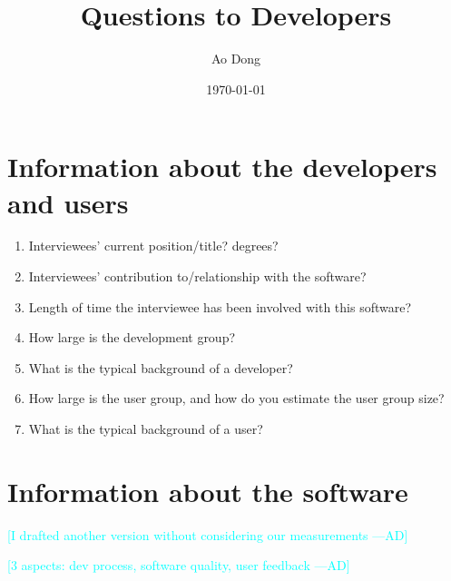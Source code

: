 \documentclass[12pt]{article}
\title{Questions to Developers}
\author{Ao Dong}
\date{\today}
\newcommand{\authornote}[3]{\textcolor{#1}{[#3 ---#2]}}
\newcommand{\authornote}[3]{}
\newcommand{\ad}[1]{\authornote{cyan}{AD}{#1}} %
\begin{document}
\maketitle

\section{Information about the developers and users}\citep{Jegatheesan2016}
\begin{enumerate}
\item Interviewees' current position/title? degrees?
\item Interviewees' contribution to/relationship with the software?
\item Length of time the interviewee has been involved with this software?
\item How large is the development group?
\item What is the typical background of a developer?
\item How large is the user group, and how do you estimate the user group size?
\item What is the typical background of a user?
\end{enumerate}

\section{Information about the software}

\ad{I drafted another version without considering our measurements}

\noindent\ad{3 aspects: dev process, software quality, user feedback}
\end{document}
